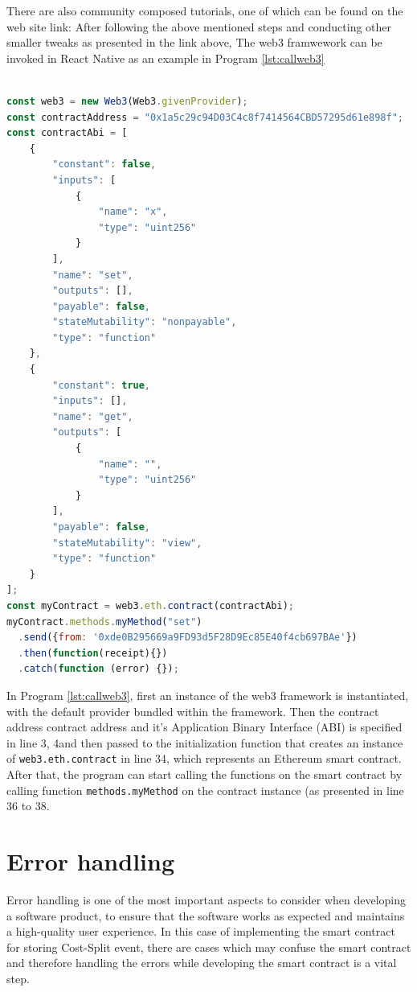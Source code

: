 \documentclass[twoside,numperchapter]{tutthesis} %
\begin{document}
There are also community composed tutorials, one of which can be found on the web site link: \citep{InstallWeb3}
After following the above mentioned steps and conducting other smaller tweaks as presented in the link above, The web3 framwework can be invoked in React Native as an example in Program \ref{lst:callweb3}

\begin{lstlisting}[float,caption={Calling Web3 functions and making transactions on the Ethereum blockchain \citep{SolidityDocumentation}.},label={lst:callweb3},language=Javascript]

const web3 = new Web3(Web3.givenProvider);
const contractAddress = "0x1a5c29c94D03C4c8f7414564CBD57295d61e898f";
const contractAbi = [
	{
		"constant": false,
		"inputs": [
			{
				"name": "x",
				"type": "uint256"
			}
		],
		"name": "set",
		"outputs": [],
		"payable": false,
		"stateMutability": "nonpayable",
		"type": "function"
	},
	{
		"constant": true,
		"inputs": [],
		"name": "get",
		"outputs": [
			{
				"name": "",
				"type": "uint256"
			}
		],
		"payable": false,
		"stateMutability": "view",
		"type": "function"
	}
];
const myContract = web3.eth.contract(contractAbi);
myContract.methods.myMethod("set")
  .send({from: '0xde0B295669a9FD93d5F28D9Ec85E40f4cb697BAe'})
  .then(function(receipt){})
  .catch(function (error) {});

\end{lstlisting}

In Program \ref{lst:callweb3}, first an instance of the web3 framework is instantiated, with the default provider bundled within the framework. Then the contract address contract address and it's Application Binary Interface (ABI) is specified in line 3, 4and then passed to the initialization function that creates an instance of \texttt{web3.eth.contract} in line 34, which represents an Ethereum smart contract. After that, the program can start calling the functions on the smart contract by calling function \texttt{methods.myMethod} on the contract instance (as presented in line 36 to 38.

\section{Error handling}

Error handling is one of the most important aspects to consider when developing a software product, to ensure that the software works as expected and maintains a high-quality user experience. In this case of implementing the smart contract for storing Cost-Split event, there are cases which may confuse the smart contract and therefore handling the errors while developing the smart contract is a vital step.
\end{document}

